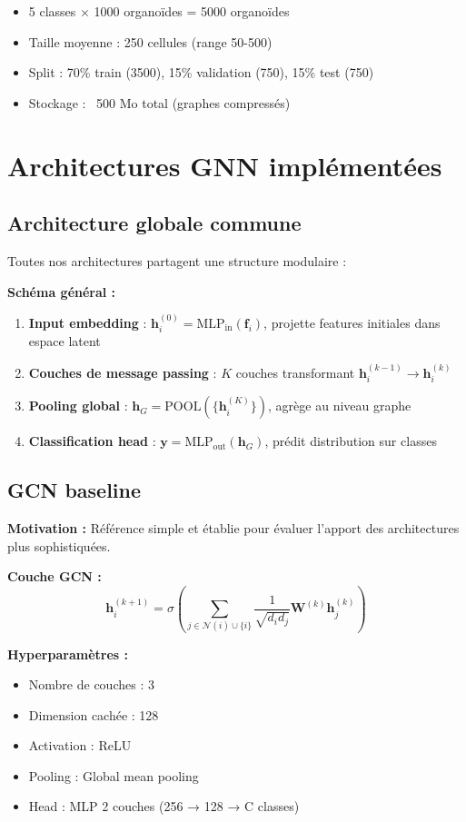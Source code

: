\begin{itemize}
    \item 5 classes × 1000 organoïdes = 5000 organoïdes
    \item Taille moyenne : 250 cellules (range 50-500)
    \item Split : 70\% train (3500), 15\% validation (750), 15\% test (750)
    \item Stockage : ~500 Mo total (graphes compressés)
\end{itemize}

\section{Architectures GNN implémentées}

\subsection{Architecture globale commune}

Toutes nos architectures partagent une structure modulaire :

\textbf{Schéma général :}
\begin{enumerate}
    \item \textbf{Input embedding} : $\mathbf{h}_i^{(0)} = \text{MLP}_{\text{in}}(\mathbf{f}_i)$, projette features initiales dans espace latent
    \item \textbf{Couches de message passing} : $K$ couches transformant $\mathbf{h}_i^{(k-1)} \rightarrow \mathbf{h}_i^{(k)}$
    \item \textbf{Pooling global} : $\mathbf{h}_G = \text{POOL}(\{\mathbf{h}_i^{(K)}\})$, agrège au niveau graphe
    \item \textbf{Classification head} : $\mathbf{y} = \text{MLP}_{\text{out}}(\mathbf{h}_G)$, prédit distribution sur classes
\end{enumerate}

\subsection{GCN baseline}

\textbf{Motivation :}
Référence simple et établie pour évaluer l'apport des architectures plus sophistiquées.

\textbf{Couche GCN :}
\[
\mathbf{h}_i^{(k+1)} = \sigma\left(\sum_{j \in \mathcal{N}(i) \cup \{i\}} \frac{1}{\sqrt{d_i d_j}} \mathbf{W}^{(k)}\mathbf{h}_j^{(k)}\right)
\]

\textbf{Hyperparamètres :}
\begin{itemize}
    \item Nombre de couches : 3
    \item Dimension cachée : 128
    \item Activation : ReLU
    \item Pooling : Global mean pooling
    \item Head : MLP 2 couches (256 → 128 → C classes)
\end{itemize}


